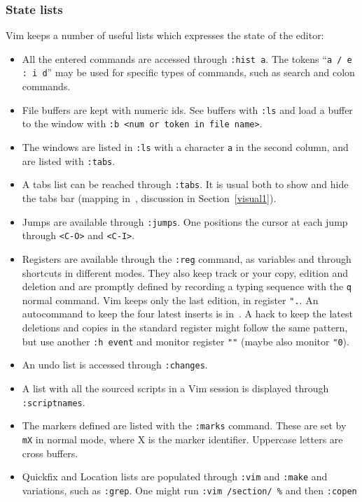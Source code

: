 \documentclass{article}
\newcommand{\ttt}[1] {
	\texttt{<#1>}}
\newcommand{\tttt}[1]{\texttt{#1}}
\begin{document}
\subsubsection{State lists}\label{state}
Vim keeps a number of useful lists which expresses the state of the editor:
\begin{itemize}
	\item All the entered commands are accessed through \tttt{:hist a}. 
    The tokens ``\tttt{a / e : i d}'' may be used for specific types of commands, such
		as search and colon commands.
	\item File buffers are kept with numeric ids. See buffers with \tttt{:ls} and load a buffer to the window with \tttt{:b <num or token in file name>}.
  \item The windows are listed in \tttt{:ls} with a character \tttt{a} in the second column, and are listed with \tttt{:tabs}.
	\item A tabs list can be reached through \tttt{:tabs}.
		It is usual both to show and hide the tabs bar (mapping
    in~\cite{vimrc}, discussion in Section~\ref{visual1}).
	\item Jumps are available through \tttt{:jumps}.
		One positions the cursor at each jump through \ttt{C-O} and \ttt{C-I}.
  \item Registers are available through the \tttt{:reg} command, as variables and through shortcuts in different modes.
    They also keep track or your copy, edition and deletion and are promptly defined
    by recording a typing sequence with the \tttt{q} normal command.
    Vim keeps only the last edition, in register \tttt{".}.
    An autocommand to keep the four latest inserts is in~\cite{vimrc}.
    A hack to keep the latest deletions and copies in the standard register
    might follow the same pattern, but use another \tttt{:h event} and
    monitor register \tttt{""} (maybe also monitor \tttt{"0}).
	\item An undo list is accessed through \tttt{:changes}.
	\item A list with all the sourced scripts in a Vim session is displayed through \tttt{:scriptnames}.
	\item The markers defined are listed with the \tttt{:marks} command.
		These are set by \tttt{mX} in normal mode, where X is the marker identifier.
		Uppercase letters are cross buffers.
	\item Quickfix and Location lists are populated through \tttt{:vim} and \tttt{:make}
		and variations, such as \tttt{:grep}.
		One might run \tttt{:vim /section/ \%} and then \tttt{:copen}

\end{itemize}
\end{document}
